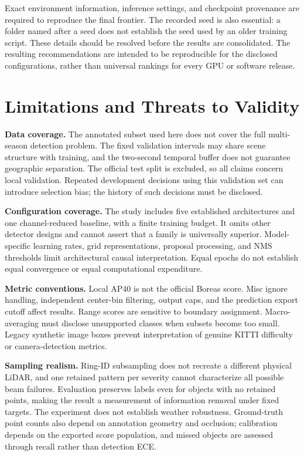 \documentclass[10pt,twocolumn]{article}
\begin{document}
Exact environment information, inference settings, and checkpoint provenance are required to reproduce the final frontier. The recorded seed is also essential: a folder named after a seed does not establish the seed used by an older training script. These details should be resolved before the results are consolidated. The resulting recommendations are intended to be reproducible for the disclosed configurations, rather than universal rankings for every GPU or software release.

\section{Limitations and Threats to Validity}
\label{sec:limitations}
\textbf{Data coverage.} The annotated subset used here does not cover the full multi-season detection problem. The fixed validation intervals may share scene structure with training, and the two-second temporal buffer does not guarantee geographic separation. The official test split is excluded, so all claims concern local validation. Repeated development decisions using this validation set can introduce selection bias; the history of such decisions must be disclosed.

\textbf{Configuration coverage.} The study includes five established architectures and one channel-reduced baseline, with a finite training budget. It omits other detector designs and cannot assert that a family is universally superior. Model-specific learning rates, grid representations, proposal processing, and NMS thresholds limit architectural causal interpretation. Equal epochs do not establish equal convergence or equal computational expenditure.

\textbf{Metric conventions.} Local AP40 is not the official Boreas score. Misc ignore handling, independent center-bin filtering, output caps, and the prediction export cutoff affect results. Range scores are sensitive to boundary assignment. Macro-averaging must disclose unsupported classes when subsets become too small. Legacy synthetic image boxes prevent interpretation of genuine KITTI difficulty or camera-detection metrics.

\textbf{Sampling realism.} Ring-ID subsampling does not recreate a different physical LiDAR, and one retained pattern per severity cannot characterize all possible beam failures. Evaluation preserves labels even for objects with no retained points, making the result a measurement of information removal under fixed targets. The experiment does not establish weather robustness. Ground-truth point counts also depend on annotation geometry and occlusion; calibration depends on the exported score population, and missed objects are assessed through recall rather than detection ECE.
\end{document}
